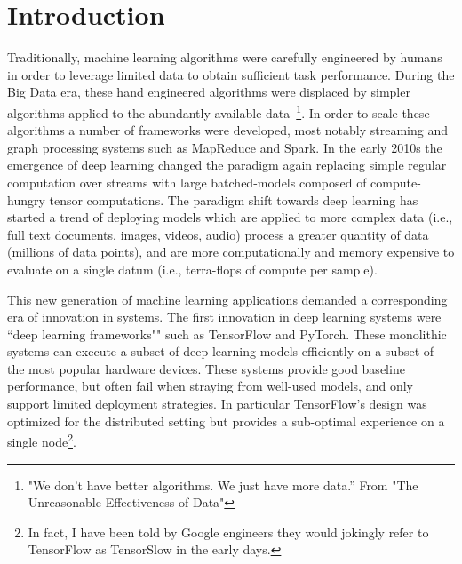 \chapter{Introduction}
\label{ch:intro}

Traditionally, machine learning algorithms were carefully engineered by humans
  in order to leverage limited data to obtain sufficient task performance.
During the Big Data era, these hand engineered algorithms were displaced by
  simpler algorithms applied to the abundantly available data~\citep{unreasonable}\footnote{"We don’t have better algorithms. We just have more data.” From "The Unreasonable Effectiveness of Data"}.
In order to scale these algorithms a number of frameworks were
  developed, most notably streaming and graph processing systems such as MapReduce and Spark.
In the early 2010s the emergence of deep learning changed the paradigm again
  replacing simple regular computation over streams with large batched-models
  composed of compute-hungry tensor computations.
The paradigm shift towards deep learning has started a trend of deploying models
  which are applied to more complex data (i.e., full text documents, images, videos, audio)
  process a greater quantity of data (millions of data points),
  and are more computationally and memory expensive to evaluate on a single datum (i.e., terra-flops of compute per sample).

This new generation of machine learning applications demanded a corresponding era of
  innovation in systems.
The first innovation in deep learning systems were
  ``deep learning frameworks"" such as TensorFlow and PyTorch.
These monolithic systems can execute a subset of deep learning models
  efficiently on a subset of the most popular hardware devices.
These systems provide good baseline performance, but often fail
  when straying from well-used models, and only support limited deployment strategies.
In particular TensorFlow's design was optimized for the distributed setting
  but provides a sub-optimal experience on a single node\footnote{In fact, I have been told by Google engineers they would jokingly refer to TensorFlow as TensorSlow in the early days.}.

